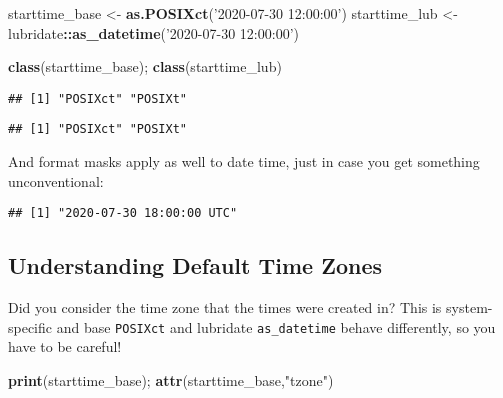 \documentclass[
]{book}
\newenvironment{Shaded}{\begin{snugshade}}{\end{snugshade}}
\newcommand{\DataTypeTok}[1]{\textcolor[rgb]{0.13,0.29,0.53}{#1}}
\newcommand{\KeywordTok}[1]{\textcolor[rgb]{0.13,0.29,0.53}{\textbf{#1}}}
\newcommand{\NormalTok}[1]{#1}
\newcommand{\OperatorTok}[1]{\textcolor[rgb]{0.81,0.36,0.00}{\textbf{#1}}}
\newcommand{\StringTok}[1]{\textcolor[rgb]{0.31,0.60,0.02}{#1}}
\begin{document}
\begin{Shaded}
\begin{Highlighting}[]
\NormalTok{starttime_base <-}\StringTok{ }\KeywordTok{as.POSIXct}\NormalTok{(}\StringTok{'2020-07-30 12:00:00'}\NormalTok{)}
\NormalTok{starttime_lub <-}\StringTok{ }\NormalTok{lubridate}\OperatorTok{::}\KeywordTok{as_datetime}\NormalTok{(}\StringTok{'2020-07-30 12:00:00'}\NormalTok{)}

\KeywordTok{class}\NormalTok{(starttime_base); }\KeywordTok{class}\NormalTok{(starttime_lub)}
\end{Highlighting}
\end{Shaded}

\begin{verbatim}
## [1] "POSIXct" "POSIXt"
\end{verbatim}

\begin{verbatim}
## [1] "POSIXct" "POSIXt"
\end{verbatim}

And format masks apply as well to date time, just in case you get something unconventional:

\begin{Shaded}
\end{Shaded}

\begin{verbatim}
## [1] "2020-07-30 18:00:00 UTC"
\end{verbatim}

\hypertarget{understanding-default-time-zones}{%
\subsection{Understanding Default Time Zones}\label{understanding-default-time-zones}}

Did you consider the time zone that the times were created in? This is system-specific and base \texttt{POSIXct} and lubridate \texttt{as\_datetime} behave differently, so you have to be careful!

\begin{Shaded}
\begin{Highlighting}[]
\KeywordTok{print}\NormalTok{(starttime_base); }\KeywordTok{attr}\NormalTok{(starttime_base,}\StringTok{"tzone"}\NormalTok{)}
\end{Highlighting}
\end{Shaded}
\end{document}

